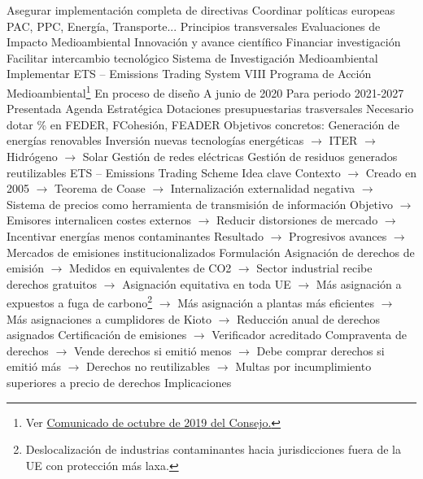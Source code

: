 \documentclass{nuevotema}
\begin{document}
\begin{esquemal}
				\4 Asegurar implementación completa de directivas
				\4 Coordinar políticas europeas
				\4[] PAC, PPC, Energía, Transporte...
				\4[] Principios transversales
				\4[] Evaluaciones de Impacto Medioambiental
				\4 Innovación y avance científico
				\4[] Financiar investigación
				\4[] Facilitar intercambio tecnológico
				\4[] Sistema de Investigación Medioambiental
				\4 Implementar ETS -- Emissions Trading System
			\3 VIII Programa de Acción Medioambiental\footnote{Ver \href{https://www.consilium.europa.eu/es/press/press-releases/2019/10/04/8th-environmental-action-programme-council-adopts-conclusions/}{Comunicado de octubre de 2019 del Consejo.}}
				\4 En proceso de diseño
				\4[] A junio de 2020
				\4 Para periodo 2021-2027
				\4 Presentada Agenda Estratégica
				\4 Dotaciones presupuestarias trasversales
				\4[] Necesario dotar \% en FEDER, FCohesión, FEADER
				\4 Objetivos concretos:
				\4[] Generación de energías renovables
				\4[] Inversión nuevas tecnologías energéticas
				\4[] $\to$ ITER
				\4[] $\to$ Hidrógeno
				\4[] $\to$ Solar
				\4[] Gestión de redes eléctricas
				\4[] Gestión de residuos generados reutilizables
			\3 ETS -- Emissions Trading Scheme
				\4 Idea clave
				\4[] Contexto
				\4[] $\to$ Creado en 2005
				\4[] $\to$ Teorema de Coase
				\4[] $\to$ Internalización externalidad negativa
				\4[] $\to$ Sistema de precios como herramienta de transmisión de información
				\4[] Objetivo
				\4[] $\to$ Emisores internalicen costes externos
				\4[] $\to$ Reducir distorsiones de mercado
				\4[] $\to$ Incentivar energías menos contaminantes
				\4[] Resultado
				\4[] $\to$ Progresivos avances
				\4[] $\to$ Mercados de emisiones institucionalizados
				\4 Formulación
				\4[] Asignación de derechos de emisión
				\4[] $\to$ Medidos en equivalentes de CO2
				\4[] $\to$ Sector industrial recibe derechos gratuitos
				\4[] $\to$ Asignación equitativa en toda UE
				\4[] $\to$ Más asignación a expuestos a fuga de carbono\footnote{Deslocalización de industrias contaminantes hacia jurisdicciones fuera de la UE con protección más laxa.}
				\4[] $\to$ Más asignación a plantas más eficientes
				\4[] $\to$ Más asignaciones a cumplidores de Kioto
				\4[] $\to$ Reducción anual de derechos asignados
				\4[] Certificación de emisiones
				\4[] $\to$ Verificador acreditado
				\4[] Compraventa de derechos
				\4[] $\to$ Vende derechos si emitió menos
				\4[] $\to$ Debe comprar derechos si emitió más
				\4[] $\to$ Derechos no reutilizables
				\4[] $\to$ Multas por incumplimiento superiores a precio de derechos
				\4 Implicaciones

\end{esquemal}
\end{document}
